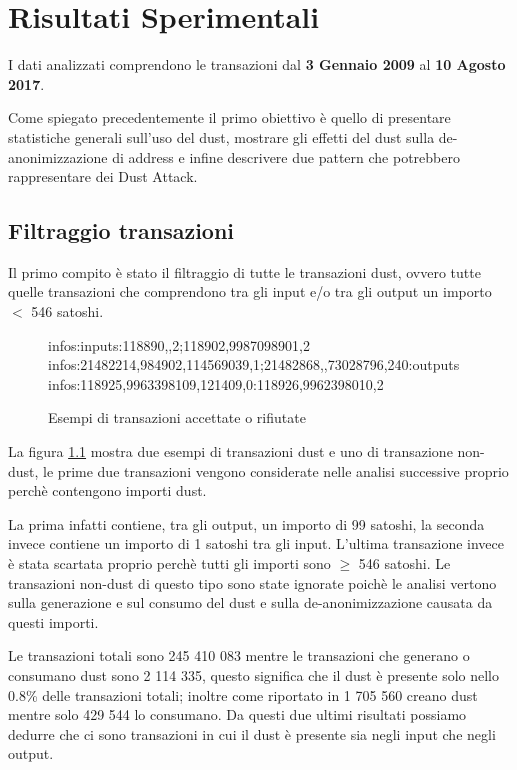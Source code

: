 \chapter{Risultati Sperimentali}
\captionsetup[table]{name=Tabella}
I dati analizzati comprendono le transazioni dal \textbf{3 Gennaio 2009} al \textbf{10 Agosto 2017}.

Come spiegato precedentemente il primo obiettivo è quello di presentare statistiche generali sull'uso del dust, mostrare gli effetti del dust sulla de-anonimizzazione di address e infine descrivere due pattern che potrebbero rappresentare dei Dust Attack.
\section{Filtraggio transazioni}
Il primo compito è stato il filtraggio di tutte le transazioni dust, ovvero tutte quelle transazioni che comprendono tra gli input e/o tra gli output un importo $<$ 546 satoshi.
\begin{figure}[H]
\begin{mdframed}
 infos:inputs:118890,,2;118902,9987098901,2 \checkmark\\
 infos:21482214,984902,114569039,1;21482868,,73028796,240:outputs \checkmark\\
 infos:118925,9963398109,121409,0:118926,9962398010,2 
\end{mdframed}
\caption{Esempi di transazioni accettate o rifiutate}
\label{tx_dust}
\end{figure}
\Floatbarrier
La figura \ref{tx_dust} mostra due esempi di transazioni dust e uno di transazione non-dust, le prime due transazioni vengono considerate nelle analisi successive proprio perchè contengono importi dust. 

La prima infatti contiene, tra gli output, un importo di 99 satoshi, la seconda invece contiene un importo di 1 satoshi tra gli input. L'ultima transazione invece è stata scartata proprio perchè tutti gli importi sono $\ge$ 546 satoshi. Le transazioni non-dust di questo tipo sono state ignorate poichè le analisi vertono sulla generazione e sul consumo del dust e sulla de-anonimizzazione causata da questi importi.

Le transazioni totali sono 245 410 083 mentre le transazioni che generano o consumano dust sono  2 114 335, questo significa che il dust è presente solo nello 0.8\% delle transazioni totali; inoltre come riportato in \cite{dustAnalisi} 1 705 560 creano dust mentre solo 429 544 lo consumano. Da questi due ultimi risultati possiamo dedurre che ci sono transazioni in cui il dust è presente sia negli input che negli output.

